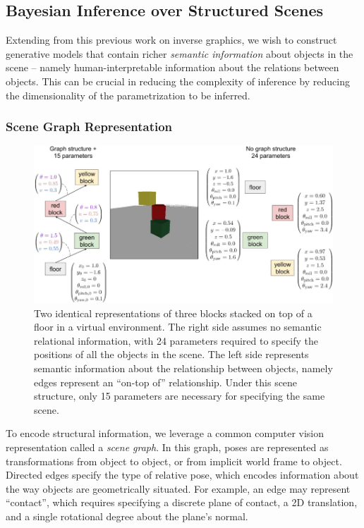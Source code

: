   \subsection{Bayesian Inference over Structured Scenes}

    Extending from this previous work on inverse graphics, we wish to construct
    generative models that contain richer \textit{semantic information} about
    objects in the scene -- namely human-interpretable information about the
    relations between objects. This can be crucial in reducing the complexity
    of inference by reducing the dimensionality of the parametrization to be
    inferred.

    \subsubsection{Scene Graph Representation}

      \begin{figure}
        \centering
        \includegraphics[width=\textwidth]{figures/contact-graph.png}
        \caption{\small
          Two identical representations of three blocks stacked on top of a
          floor in a virtual environment. The right side assumes no semantic
          relational information, with 24 parameters required to specify the
          positions of all the objects in the scene. The left side represents
          semantic information about the relationship between objects, namely
          edges represent an ``on-top of'' relationship. Under this scene
          structure, only 15 parameters are necessary for specifying the same
          scene. 
        }
        \label{fig:contact-graph}
      \end{figure}

      To encode structural information, we leverage a common computer vision
      representation called a \textit{scene graph}. In this graph, poses are
      represented as transformations from object to object, or from implicit
      world frame to object. Directed edges specify the type of relative pose,
      which encodes information about the way objects are geometrically
      situated. For example, an edge may represent ``contact'', which requires
      specifying a discrete plane of contact, a 2D translation, and a single
      rotational degree about the plane's normal.


